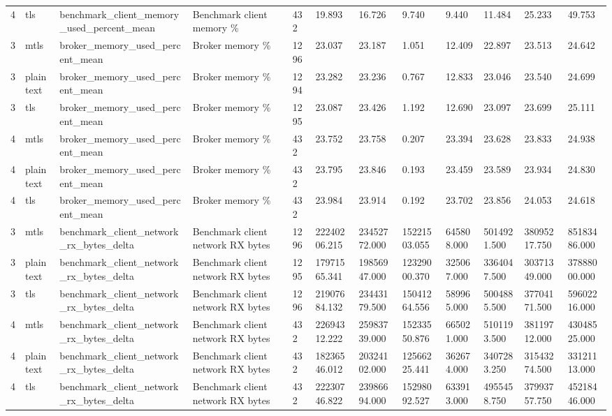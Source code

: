 \begin{longtable}{llllllllllll}
4 & tls & benchmark\_client\_memory\_used\_percent\_mean & Benchmark client memory \% & 432 & 19.893 & 16.726 & 9.740 & 9.440 & 11.484 & 25.233 & 49.753 \\
3 & mtls & broker\_memory\_used\_percent\_mean & Broker memory \% & 1296 & 23.037 & 23.187 & 1.051 & 12.409 & 22.897 & 23.513 & 24.642 \\
3 & plaintext & broker\_memory\_used\_percent\_mean & Broker memory \% & 1294 & 23.282 & 23.236 & 0.767 & 12.833 & 23.046 & 23.540 & 24.699 \\
3 & tls & broker\_memory\_used\_percent\_mean & Broker memory \% & 1295 & 23.087 & 23.426 & 1.192 & 12.690 & 23.097 & 23.699 & 25.111 \\
4 & mtls & broker\_memory\_used\_percent\_mean & Broker memory \% & 432 & 23.752 & 23.758 & 0.207 & 23.394 & 23.628 & 23.833 & 24.938 \\
4 & plaintext & broker\_memory\_used\_percent\_mean & Broker memory \% & 432 & 23.795 & 23.846 & 0.193 & 23.459 & 23.589 & 23.934 & 24.830 \\
4 & tls & broker\_memory\_used\_percent\_mean & Broker memory \% & 432 & 23.984 & 23.914 & 0.192 & 23.702 & 23.856 & 24.053 & 24.618 \\
3 & mtls & benchmark\_client\_network\_rx\_bytes\_delta & Benchmark client network RX bytes & 1296 & 22240206.215 & 23452772.000 & 15221503.055 & 645808.000 & 5014921.500 & 38095217.750 & 85183486.000 \\
3 & plaintext & benchmark\_client\_network\_rx\_bytes\_delta & Benchmark client network RX bytes & 1295 & 17971565.341 & 19856947.000 & 12329000.370 & 325067.000 & 3364047.500 & 30371349.000 & 37888000.000 \\
3 & tls & benchmark\_client\_network\_rx\_bytes\_delta & Benchmark client network RX bytes & 1296 & 21907684.132 & 23443179.500 & 15041264.556 & 589965.000 & 5004885.500 & 37704171.500 & 59602216.000 \\
4 & mtls & benchmark\_client\_network\_rx\_bytes\_delta & Benchmark client network RX bytes & 432 & 22694312.222 & 25983739.000 & 15233550.876 & 665021.000 & 5101193.500 & 38119712.000 & 43048525.000 \\
4 & plaintext & benchmark\_client\_network\_rx\_bytes\_delta & Benchmark client network RX bytes & 432 & 18236546.012 & 20324102.000 & 12566225.441 & 362674.000 & 3407283.250 & 31543274.500 & 33121113.000 \\
4 & tls & benchmark\_client\_network\_rx\_bytes\_delta & Benchmark client network RX bytes & 432 & 22230746.822 & 23986694.000 & 15298092.527 & 633913.000 & 4955458.750 & 37993757.750 & 45218446.000 \\

\end{longtable}
